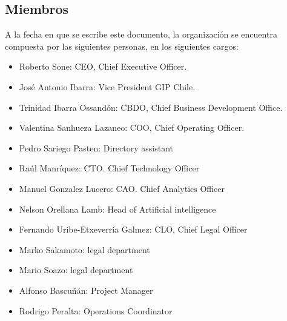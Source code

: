 \subsection{Miembros}
A la fecha en que se  escribe este documento, la organización se  encuentra compuesta por las siguientes personas, en los siguientes cargos:

\begin{itemize}
\item Roberto Sone: CEO, Chief Executive Officer.
\item José Antonio Ibarra: Vice President GIP Chile.
\item Trinidad Ibarra Ossandón: CBDO, Chief Business Development Office.
\item Valentina Sanhueza Lazaneo: COO, Chief Operating Officer.
\item Pedro Sariego Pasten: Directory assistant
\item Raúl Manríquez: CTO. Chief Technology Officer
\item Manuel Gonzalez Lucero: CAO. Chief Analytics Officer
\item Nelson Orellana Lamb: Head of Artificial intelligence 
\item Fernando Uribe-Etxeverría Galmez: CLO, Chief Legal Officer 
\item Marko Sakamoto: legal department
\item Mario Soazo: legal department
\item  Alfonso Bascuñán: Project Manager
\item Rodrigo Peralta: Operations Coordinator
\end{itemize}
